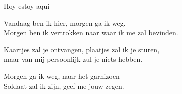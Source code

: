 \begin{song}[huayno]{Hoy estoy aqui}
\end{song}

\clearpage
\begin{translation}
Vandaag ben ik hier, morgen ga ik weg.\\
Morgen ben ik vertrokken naar waar ik me zal bevinden.\vspace{\wlskip}

Kaartjes zal je ontvangen, plaatjes zal ik je sturen,\\
maar van mij persoonlijk zul je niets hebben.\vspace{\wlskip}

Morgen ga ik weg, naar het garnizoen\\
Soldaat zal ik zijn, geef me jouw zegen.
\end{translation}
